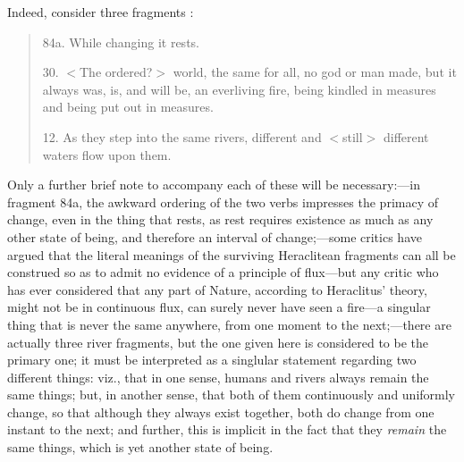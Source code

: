 Indeed, consider three fragments \cite{Robinson1987}:
\begin{quote}
84a. While changing it rests.

30. $<$The ordered?$>$ world, the same for all, no god or man made, but it always was, is, and will be, an everliving fire, being kindled in measures and being put out in measures.

12. As they step into the same rivers, different and $<$still$>$ different waters flow upon them.
\end{quote}
Only a further brief note to accompany each of these will be necessary:---in fragment 84a, the awkward ordering of the two verbs impresses the primacy of change, even in the thing that rests, as rest requires existence as much as any other state of being, and therefore an interval of change;---some critics have argued that the literal meanings of the surviving Heraclitean fragments can all be construed so as to admit no evidence of a principle of flux---but any critic who has ever considered that any part of Nature, according to Heraclitus' theory, might not be in continuous flux, can surely never have seen a fire---a singular thing that is never the same anywhere, from one moment to the next;---there are actually three river fragments, but the one given here is considered to be the primary one; it must be interpreted as a singlular statement regarding two different things: viz., that in one sense, humans and rivers always remain the same things; but, in another sense, that both of them continuously and uniformly change, so that although they always exist together, both do change from one instant to the next; and further, this is implicit in the fact that they \textit{remain} the same things, which is yet another state of being.

